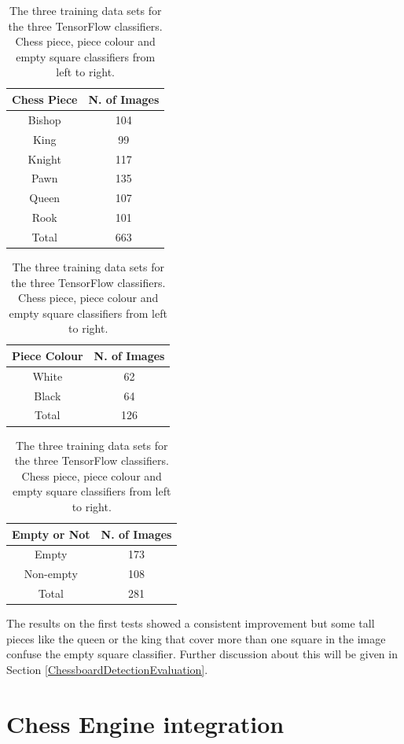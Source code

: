 \documentclass{l4proj}
\begin{document}
\begin{table}[h!] \label{FinalTrainingData}

	\begin{tabular}{|c|c|}
		\hline
		Chess Piece & N. of Images  \\
		\hline
		\rowcolor{brown!45} Bishop & 104 \\
		King & 99 \\
		\rowcolor{brown!45} Knight & 117 \\
		Pawn & 135 \\
		\rowcolor{brown!45} Queen & 107 \\
		Rook & 101 \\
		\hline
		\rowcolor{brown!45} Total &  663\\
		\hline
	\end{tabular}
	\hfill
	\begin{tabular}{|c|c|}
		\hline
		Piece Colour & N. of Images  \\
		\hline
		\rowcolor{brown!45} White & 62 \\
		Black & 64 \\
		\hline
		\rowcolor{brown!45} Total &  126\\
		\hline
	\end{tabular}
	\hfill
	\begin{tabular}{|c|c|}
		\hline
		Empty or Not & N. of Images  \\
		\hline
		\rowcolor{brown!45} Empty & 173 \\
		Non-empty & 108 \\
		\hline
		\rowcolor{brown!45} Total &  281\\
		\hline
	\end{tabular}
	\caption{The three training data sets for the three TensorFlow classifiers.  Chess piece, piece colour and empty square classifiers from left to right.}
\end{table}

\pagebreak
The results on the first tests showed a consistent improvement but some tall pieces like the queen or the king that cover more than one square in the image confuse the empty square classifier. Further discussion about this will be given in Section \ref{ChessboardDetectionEvaluation}.

\vspace{-5mm}
\section{Chess Engine integration} \label{Chess_Engine}
\end{document}
